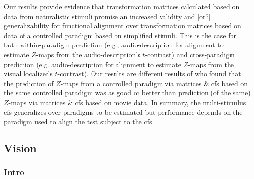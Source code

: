 %
Our results provide evidence that transformation matrices calculated based on
data from naturalistic stimuli promise an increased validity and [or?]
generalizability for functional alignment over transformation matrices based on
data of a controlled paradigm based on simplified stimuli.
%
This is the case for both within-paradigm prediction (e.g., audio-description
for alignment to estimate $Z$-maps from the audio-description's $t$-contrast)
and cross-paradigm prediction (e.g. audio-description for alignment to estimate
$Z$-maps from the visual localizer's $t$-contrast).
%
Our results are different results of \citet{haxby2011common} who found that the
prediction of $Z$-maps from a controlled paradigm via matrices \& \ac{cfs} based
on the same controlled paradigm was as good or better than prediction (of the
same) $Z$-maps via matrices \& \ac{cfs} based on movie data.
%
In summary, the multi-stimulus \ac{cfs} generalizes over paradigms to be
estimated but performance depends on the paradigm used to align the test subject
to the \ac{cfs}.



\subsection{Vision}





\subsubsection{Intro}


